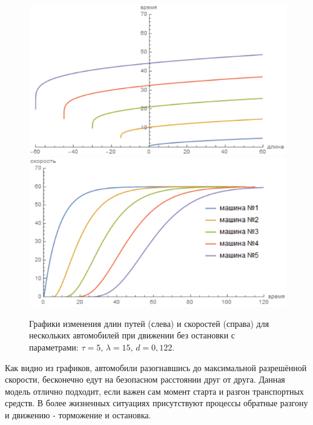 \documentclass[12pt, a4paper]{extarticle}
\numberwithin{equation}{section}
\begin{document}
\begin{figure}[h!]
	\begin{center}
		\begin{minipage}[h!]{0.48\linewidth}
			\includegraphics[width=1\linewidth,height=0.2\textheight]
			{Images/distance_without_stop_d=0,122_tau=5.png}
		\end{minipage}
		\hfill 
		\begin{minipage}[h!]{0.48\linewidth}
			\includegraphics[width=1\linewidth,height=0.2\textheight]
			{Images/speed_without_stop_d=0,122_tau=5.png}
		\end{minipage}
		\label{without_stop_d=0,122_tau=5}		
		\caption{Графики изменения длин путей (слева) и скоростей (справа) для нескольких автомобилей при движении без остановки с параметрами: $\tau=5$, $\lambda=15$, $d=0,122$.}
	\end{center}
\end{figure}

Как видно из графиков, автомобили разогнавшись до максимальной разрешённой скорости, бесконечно едут на безопасном расстоянии друг от друга. Данная модель отлично подходит, если важен сам момент старта и разгон транспортных средств. В более жизненных ситуациях присутствуют процессы обратные разгону и движению - торможение и остановка. 
\end{document}
